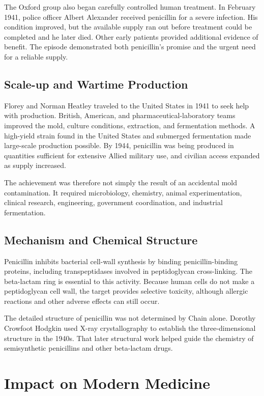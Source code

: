 The Oxford group also began carefully controlled human treatment. In February 1941, police officer Albert Alexander received penicillin for a severe infection. His condition improved, but the available supply ran out before treatment could be completed and he later died. Other early patients provided additional evidence of benefit. The episode demonstrated both penicillin's promise and the urgent need for a reliable supply.

\subsection{Scale-up and Wartime Production}

Florey and Norman Heatley traveled to the United States in 1941 to seek help with production. British, American, and pharmaceutical-laboratory teams improved the mold, culture conditions, extraction, and fermentation methods. A high-yield strain found in the United States and submerged fermentation made large-scale production possible. By 1944, penicillin was being produced in quantities sufficient for extensive Allied military use, and civilian access expanded as supply increased.

The achievement was therefore not simply the result of an accidental mold contamination. It required microbiology, chemistry, animal experimentation, clinical research, engineering, government coordination, and industrial fermentation.

\subsection{Mechanism and Chemical Structure}

Penicillin inhibits bacterial cell-wall synthesis by binding penicillin-binding proteins, including transpeptidases involved in peptidoglycan cross-linking. The beta-lactam ring is essential to this activity. Because human cells do not make a peptidoglycan cell wall, the target provides selective toxicity, although allergic reactions and other adverse effects can still occur.

The detailed structure of penicillin was not determined by Chain alone. Dorothy Crowfoot Hodgkin used X-ray crystallography to establish the three-dimensional structure in the 1940s. That later structural work helped guide the chemistry of semisynthetic penicillins and other beta-lactam drugs.

\section{Impact on Modern Medicine}

